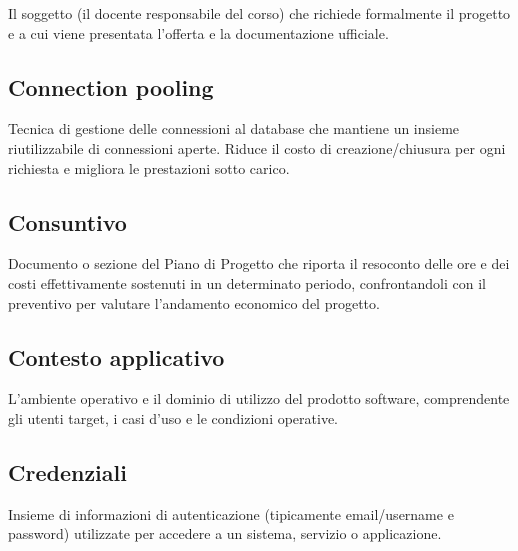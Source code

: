 \documentclass[a4paper, 11pt, oneside]{scrartcl} %
\begin{document}

Il soggetto (il docente responsabile del corso) che richiede formalmente il progetto e a cui viene presentata l'offerta e la documentazione ufficiale.

\vspace{0.5cm}

\subsection*{Connection pooling}
Tecnica di gestione delle connessioni al database che mantiene un insieme riutilizzabile di connessioni aperte. Riduce il costo di creazione/chiusura per ogni richiesta e migliora le prestazioni sotto carico.
\vspace{0.5cm}

\subsection*{Consuntivo}
Documento o sezione del Piano di Progetto che riporta il resoconto delle ore e dei costi effettivamente sostenuti in un determinato periodo, confrontandoli con il preventivo per valutare l'andamento economico del progetto.
\vspace{0.5cm}

\subsection*{Contesto applicativo}


L'ambiente operativo e il dominio di utilizzo del prodotto software, comprendente gli utenti target, i casi d'uso e le condizioni operative.

\vspace{0.5cm}

\subsection*{Credenziali}


Insieme di informazioni di autenticazione (tipicamente email/username e password) utilizzate per accedere a un sistema, servizio o applicazione.

\vspace{0.5cm}
\end{document}
